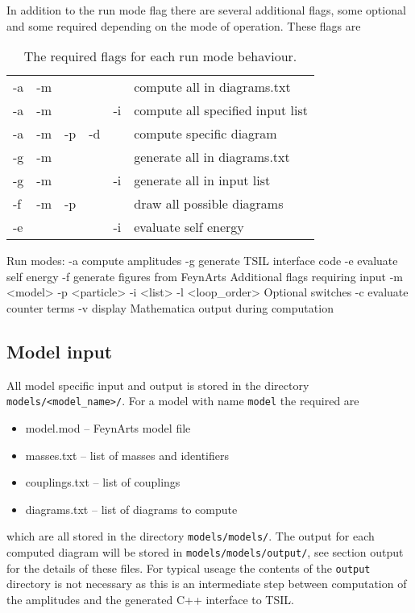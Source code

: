 In addition to the run mode flag there are several additional flags, some optional and some required depending on the mode of operation.  These flags are
\begin{table}
\caption{The required flags for each run mode behaviour.}
\begin{tabular}{l c c c c l} 
\hline
-a & -m & & & &compute all in diagrams.txt \\
-a & -m &  && -i&compute  all specified input list\\
-a & -m & -p & -d && compute specific diagram\\
-g & -m & & &  &generate all in diagrams.txt \\
-g & -m &  & & -i &generate all in input list\\
-f & -m & -p & & &draw all possible diagrams\\
-e &  & & & -i&evaluate self energy\\
\hline\end{tabular}
\end{table}


\begin{lstterm}
Run modes:
-a 		compute amplitudes
-g		generate TSIL interface code
-e		evaluate self energy
-f		generate figures from FeynArts
Additional flags requiring input
-m <model> 
-p <particle>
-i  <list>
-l <loop_order>
Optional switches
-c		evaluate counter terms
-v		display Mathematica output during computation
\end{lstterm}


\subsection{Model input}

All model specific input and output is stored in the directory \lstinline{models/<model_name>/}.  For a model with name \lstinline{model} the required are
\begin{itemize}
\item model.mod  -- FeynArts model file
\item masses.txt -- list of masses and identifiers
\item couplings.txt -- list of couplings
\item diagrams.txt -- list of diagrams to compute
\end{itemize}
which are all stored in the directory \lstinline{models/models/}.  The output for each computed diagram will be stored in \lstinline{models/models/output/}, see section output for the details of these files.  For typical useage the contents of the \lstinline{output} directory is not necessary as this is an intermediate step between computation of the amplitudes and the generated C++ interface to TSIL.

